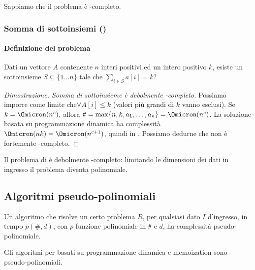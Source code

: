 Sappiamo che il problema {\subSetSumProblem} è \NP-completo.

\subsubsection{Somma di sottoinsiemi (\subSetSumProblem)}

\paragraph{Definizione del problema}
Dati un vettore \(A\) contenente \(n\) interi positivi ed un intero positivo \(k\), \alert{esiste} un sottoinsieme \(S \subseteq \{1 \dots n\}\) tale che \(\sum_{i \in S} a[i] = k\)?

\begin{proof}[Dimostrazione. Somma di sottoinsieme è debolmente \NP-completo]
Possiamo imporre come limite che\newline \(\forall A[i] \leqslant k\) (valori più grandi di \(k\) vanno esclusi).
Se \(k = \Omicron(n^c)\), allora \(\texttt{\#} = \max\{n, k, a_1, \dots, a_n\} = \Omicron(n^c)\).
La soluzione basata su programmazione dinamica ha complessità \(\Omicron(nk) = \Omicron(n^{c+1})\), quindi in {\PTIME}.
Possiamo dedurne che {\subSetSumProblem} non è fortemente \NP-completo.
\end{proof}

\begin{note}
Il problema di {\subSetSumProblem} è debolmente \NP-completo: limitando le dimensioni dei dati in ingresso il problema diventa polinomiale.
\end{note}

\subsection{Algoritmi pseudo-polinomiali}

\begin{definition*}
Un algoritmo che risolve un certo problema \(R\), per qualsiasi dato \(I\) d'ingresso, in tempo \(p(\texttt{\#},d)\), con \(p\) funzione polinomiale in \texttt{\#} e \(d\), ha complessità \alert{pseudo-polinomiale}.
\end{definition*}

\begin{observation}
Gli algoritmi per {\subSetSumProblem} basati su programmazione dinamica e memoization sono pseudo-polinomiali.
\end{observation}

